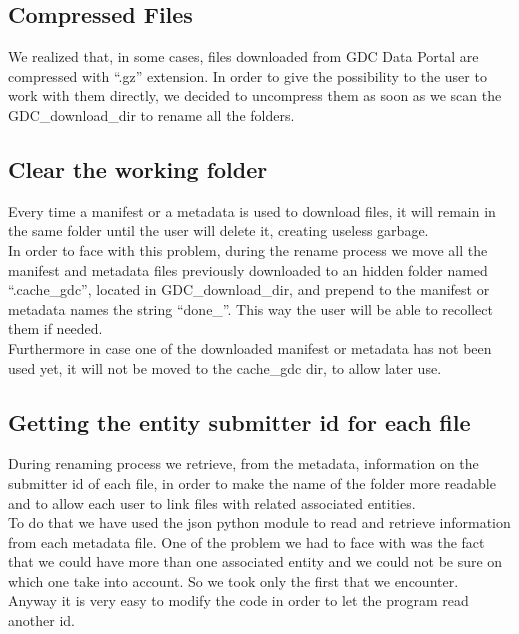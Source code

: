\documentclass[hidelinks,12pt]{article}
\begin{document}

\subsection{Compressed Files}
We realized that, in some cases, files downloaded from GDC Data Portal are compressed with ``.gz'' extension. In order to give the possibility to the user to work with them directly, we decided to uncompress them as soon as we scan the GDC\_download\_dir to rename all the folders.


\subsection{Clear the working folder}
Every time a manifest or a metadata is used to download files, it will remain in the same folder until the user will delete it, creating useless garbage. \\
In order to face with this problem, during the rename process we move all the manifest and metadata files previously downloaded to an hidden folder named ``.cache\_gdc'', located in GDC\_download\_dir, and prepend to the manifest or metadata names the string ``done\_''. This way the user will be able to recollect them if needed.\\ 
Furthermore in case one of the downloaded manifest or metadata has not been used yet, it will not be moved to the cache\_gdc dir, to allow later use.


\subsection{Getting the entity submitter id for each file}
During renaming process we retrieve, from the metadata, information on the submitter id of each file, in order to make the name of the folder more readable and to allow each user to link files with related associated entities. \\ To do that we have used the json python module to read and retrieve information from each metadata file. One of the problem we had to face with was the fact that we could have more than one associated entity and we could not be sure on which one take into account. So we took only the first that we encounter. \\Anyway it is very easy to modify the code in order to let the program read another id. 
\end{document}
